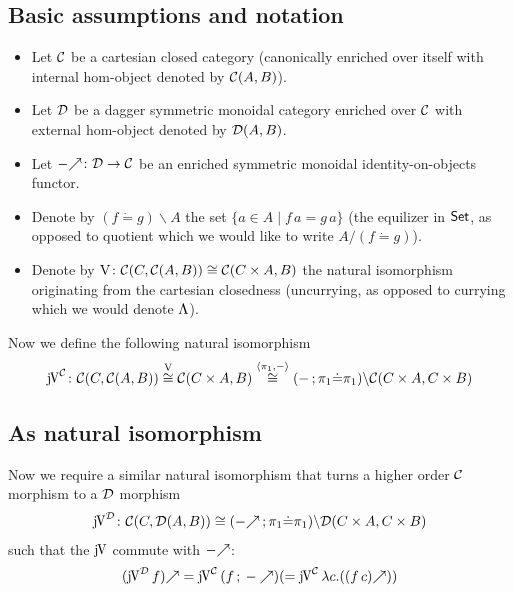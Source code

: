 \documentclass[runningheads,envcountsame]{llncs}
\begin{document}
\subsection{Basic assumptions and notation}

\begin{itemize}
    \item Let $\mathcal{C}$ be a cartesian closed category (canonically enriched over itself with internal hom-object denoted by $\mathcal{C}(A, B)$).
    \item Let $\mathcal{D}$ be a dagger symmetric monoidal category enriched over $\mathcal{C}$ with external hom-object denoted by $\mathcal{D}(A, B)$.
    \item Let $\f{-}\colon \D \to \C$ be an enriched symmetric monoidal identity-on-objects functor.
    \item Denote by $(f \dot= g)\backslash A$ the set $\{a \in A \mid f\,a = g\,a\}$ (the equilizer in $\mathsf{Set}$, as opposed to quotient which we would like to write $A/(f {\dot=} g)$).
    \item Denote by $\uncurry\colon \C(C, \homC{A}{B}) \cong \C(C \times A, B)$ the natural isomorphism originating from the cartesian closedness (uncurrying, as opposed to currying which we would denote $\curry$).
\end{itemize}

Now we define the following natural isomorphism \begin{gather}
\juncurry[\C]\colon \C(C, \homC{A}{B}) \overset{\uncurry}{\cong} \C(C \times A, B) \overset{\langle \pi_1, - \rangle}{\cong} (\comp{-}{\pi_1}{\dot=}{\pi_1})\backslash\C(C \times A, C \times B)
\end{gather}

\subsection{As natural isomorphism}

Now we require a similar natural isomorphism that turns a higher order $\mathcal{C}$ morphism to a $\mathcal{D}$ morphism
\begin{gather}
\juncurry[\D]\colon \C(C, \homD{A}{B}) \cong (\comp{\f{-}}{\pi_1}{\dot=}{\pi_1})\backslash\D(C \times A, C \times B)
\end{gather}
such that the $\juncurry$ commute with $\f{-}$:
\begin{gather}
\f{(\juncurry[\D]\,f)} = \juncurry[\C]\,(\comp{f}{\f{-}}) (= \juncurry[\C]\,\lambda c. (\f{(f\,c)})) 
\end{gather}
\end{document}

